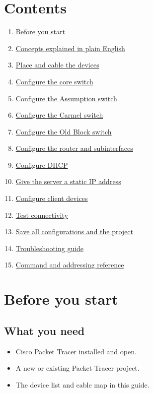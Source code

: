 \documentclass[11pt,a4paper]{article}
\begin{document}
\section*{Contents}
\begin{enumerate}[label=\textbf{\arabic*.},leftmargin=2em,itemsep=5pt]
\item \hyperref[sec:before]{Before you start}
\item \hyperref[sec:concepts]{Concepts explained in plain English}
\item \hyperref[sec:topology]{Place and cable the devices}
\item \hyperref[sec:core]{Configure the core switch}
\item \hyperref[sec:assumption]{Configure the Assumption switch}
\item \hyperref[sec:carmel]{Configure the Carmel switch}
\item \hyperref[sec:oldblock]{Configure the Old Block switch}
\item \hyperref[sec:router]{Configure the router and subinterfaces}
\item \hyperref[sec:dhcp]{Configure DHCP}
\item \hyperref[sec:server]{Give the server a static IP address}
\item \hyperref[sec:clients]{Configure client devices}
\item \hyperref[sec:tests]{Test connectivity}
\item \hyperref[sec:save]{Save all configurations and the project}
\item \hyperref[sec:trouble]{Troubleshooting guide}
\item \hyperref[sec:reference]{Command and addressing reference}
\end{enumerate}
\clearpage

\section{Before you start}\label{sec:before}
\subsection*{What you need}
\begin{itemize}
\item Cisco Packet Tracer installed and open.
\item A new or existing Packet Tracer project.
\item The device list and cable map in this guide.
\end{itemize}
\end{document}
